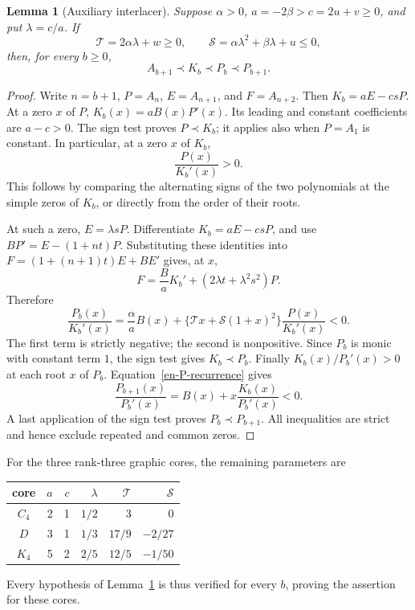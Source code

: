\documentclass[12pt]{amsart}
\newtheorem{lem}[thm]{Lemma}
\theoremstyle{definition}
\theoremstyle{remark}
\numberwithin{equation}{section}
\begin{document}
\begin{samepage}
\begin{lem}[Auxiliary interlacer]\label{en-aux}
Suppose $\alpha>0$, $a=-2\beta>c=2u+v\geq0$, and put $\lambda=c/a$. If
\[
 \mathcal T=2\alpha\lambda+w\geq0,\qquad
 \mathcal S=\alpha\lambda^2+\beta\lambda+u\leq0,
\]
then, for every $b\geq0$,
\[
 A_{b+1}\prec K_b\prec P_b\prec P_{b+1}.
\]
\end{lem}
\end{samepage}
\begin{proof}
Write $n=b+1$, $P=A_n$, $E=A_{n+1}$, and $F=A_{n+2}$. Then $K_b=aE-csP$. At a zero $x$ of $P$, $K_b(x)=aB(x)P'(x)$. Its leading and constant coefficients are $a-c>0$. The sign test proves $P\prec K_b$; it applies also when $P=A_1$ is constant. In particular, at a zero $x$ of $K_b$,
\[
 \frac{P(x)}{K_b'(x)}>0.
\]
This follows by comparing the alternating signs of the two polynomials at the simple zeros of $K_b$, or directly from the order of their roots.

At such a zero, $E=\lambda sP$. Differentiate $K_b=aE-csP$, and use $BP'=E-(1+nt)P$. Substituting these identities into $F=(1+(n+1)t)E+BE'$ gives, at $x$,
\[
 F=\frac{B}{a}K_b'+(2\lambda t+\lambda^2s^2)P.
\]
Therefore
\begin{equation}\label{en-aux-eval}
 \frac{P_b(x)}{K_b'(x)}
 =\frac\alpha a B(x)
 +\{\mathcal T x+\mathcal S(1+x)^2\}\frac{P(x)}{K_b'(x)}<0.
\end{equation}
The first term is strictly negative; the second is nonpositive. Since $P_b$ is monic with constant term $1$, the sign test gives $K_b\prec P_b$. Finally $K_b(x)/P_b'(x)>0$ at each root $x$ of $P_b$. Equation~\eqref{en-P-recurrence} gives
\[
 \frac{P_{b+1}(x)}{P_b'(x)}=B(x)+x\frac{K_b(x)}{P_b'(x)}<0.
\]
A last application of the sign test proves $P_b\prec P_{b+1}$. All inequalities are strict and hence exclude repeated and common zeros.
\end{proof}

\begin{samepage}
For the three rank-three graphic cores, the remaining parameters are
\begin{center}
\begin{tabular}{c|rrrrr}
core&$a$&$c$&$\lambda$&$\mathcal T$&$\mathcal S$\\\hline
$C_4$&2&1&$1/2$&3&0\\
$D$&3&1&$1/3$&$17/9$&$-2/27$\\
$K_4$&5&2&$2/5$&$12/5$&$-1/50$
\end{tabular}
\end{center}
\end{samepage}
Every hypothesis of Lemma~\ref{en-aux} is thus verified for every $b$, proving the assertion for these cores.
\end{document}
